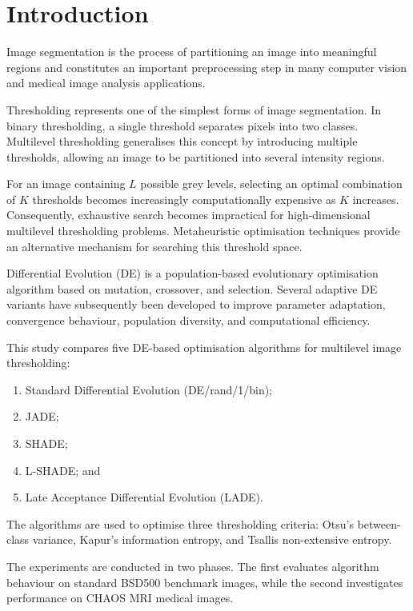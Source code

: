 \documentclass[review,authoryear]{elsarticle}
\begin{document}


\section{Introduction}
\label{sec:introduction}

Image segmentation is the process of partitioning an image into
meaningful regions and constitutes an important preprocessing step in
many computer vision and medical image analysis applications.

Thresholding represents one of the simplest forms of image segmentation.
In binary thresholding, a single threshold separates pixels into two
classes. Multilevel thresholding generalises this concept by introducing
multiple thresholds, allowing an image to be partitioned into several
intensity regions.

For an image containing $L$ possible grey levels, selecting an optimal
combination of $K$ thresholds becomes increasingly computationally
expensive as $K$ increases. Consequently, exhaustive search becomes
impractical for high-dimensional multilevel thresholding problems.
Metaheuristic optimisation techniques provide an alternative mechanism
for searching this threshold space.

Differential Evolution (DE) is a population-based evolutionary
optimisation algorithm based on mutation, crossover, and selection.
Several adaptive DE variants have subsequently been developed to improve
parameter adaptation, convergence behaviour, population diversity, and
computational efficiency.

This study compares five DE-based optimisation algorithms for multilevel
image thresholding:

\begin{enumerate}
    \item Standard Differential Evolution (DE/rand/1/bin);
    \item JADE;
    \item SHADE;
    \item L-SHADE; and
    \item Late Acceptance Differential Evolution (LADE).
\end{enumerate}

The algorithms are used to optimise three thresholding criteria:
Otsu's between-class variance, Kapur's information entropy, and
Tsallis non-extensive entropy.

The experiments are conducted in two phases. The first evaluates
algorithm behaviour on standard BSD500 benchmark images, while the
second investigates performance on CHAOS MRI medical images.
\end{document}
